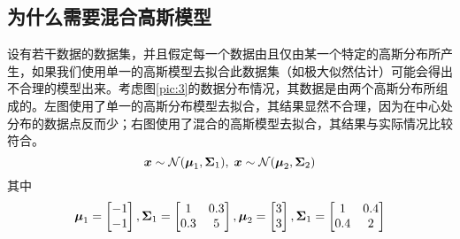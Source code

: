 \documentclass[a4paper,UTF8]{article}
\begin{document}
\subsection{为什么需要混合高斯模型}
设有若干数据的数据集，并且假定每一个数据由且仅由某一个特定的高斯分布所产生，如果我们使用单一的高斯模型去拟合此数据集（如极大似然估计）可能会得出不合理的模型出来。考虑图\ref{pic:3}的数据分布情况，其数据是由两个高斯分布所组成的。左图使用了单一的高斯分布模型去拟合，其结果显然不合理，因为在中心处分布的数据点反而少；右图使用了混合的高斯模型去拟合，其结果与实际情况比较符合。\begin{equation*}
    \boldsymbol{x}\sim\mathcal{N}(\boldsymbol{\mu}_1,\boldsymbol{\Sigma}_1),\;\boldsymbol{x}\sim\mathcal{N}(\boldsymbol{\mu}_2,\boldsymbol{\Sigma}_2)
\end{equation*}其中\begin{equation*}
    \boldsymbol{\mu}_1=\begin{bmatrix}
        -1\\-1
    \end{bmatrix},\boldsymbol{\Sigma}_1=\begin{bmatrix}
        1&0.3\\0.3&5
    \end{bmatrix},\boldsymbol{\mu}_2=\begin{bmatrix}
        3\\3
    \end{bmatrix},\boldsymbol{\Sigma}_1=\begin{bmatrix}
        1&0.4\\0.4&2
    \end{bmatrix}
\end{equation*}
\end{document}
